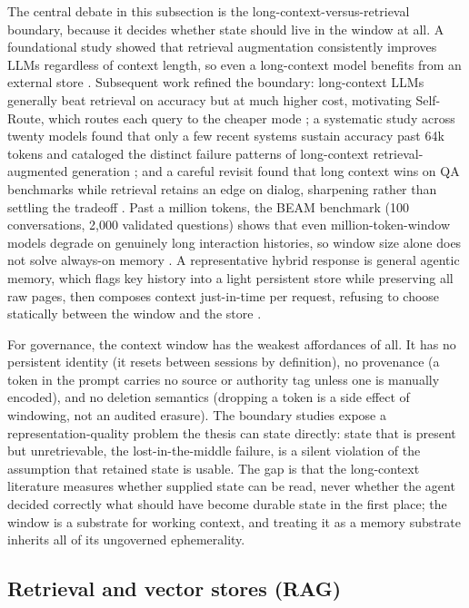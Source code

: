 The central debate in this subsection is the long-context-versus-retrieval boundary, because it decides whether state should live in the window at all. A foundational study showed that retrieval augmentation consistently improves LLMs regardless of context length, so even a long-context model benefits from an external store \citep{xu2023retrievalmeetslongcontext}. Subsequent work refined the boundary: long-context LLMs generally beat retrieval on accuracy but at much higher cost, motivating Self-Route, which routes each query to the cheaper mode \citep{li2024ragorlongcontext}; a systematic study across twenty models found that only a few recent systems sustain accuracy past 64k tokens and cataloged the distinct failure patterns of long-context retrieval-augmented generation \citep{leng2024longcontextragperformance}; and a careful revisit found that long context wins on QA benchmarks while retrieval retains an edge on dialog, sharpening rather than settling the tradeoff \citep{li2025longcontextvsrag}. Past a million tokens, the BEAM benchmark (100 conversations, 2,000 validated questions) shows that even million-token-window models degrade on genuinely long interaction histories, so window size alone does not solve always-on memory \citep{tavakoli2025beyondamilliontokens}. A representative hybrid response is general agentic memory, which flags key history into a light persistent store while preserving all raw pages, then composes context just-in-time per request, refusing to choose statically between the window and the store \citep{yan2025generalagenticmemory}.

For governance, the context window has the weakest affordances of all. It has no persistent identity (it resets between sessions by definition), no provenance (a token in the prompt carries no source or authority tag unless one is manually encoded), and no deletion semantics (dropping a token is a side effect of windowing, not an audited erasure). The boundary studies expose a representation-quality problem the thesis can state directly: state that is present but unretrievable, the lost-in-the-middle failure, is a silent violation of the assumption that retained state is usable. The gap is that the long-context literature measures whether supplied state can be read, never whether the agent decided correctly what should have become durable state in the first place; the window is a substrate for working context, and treating it as a memory substrate inherits all of its ungoverned ephemerality.

\subsection{Retrieval and vector stores (RAG)}

